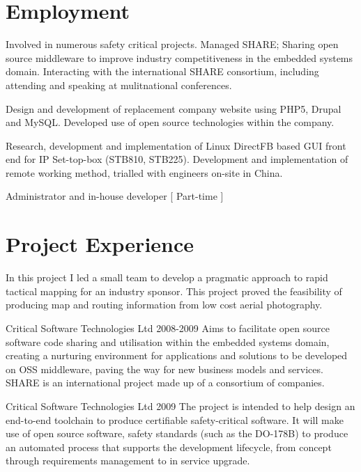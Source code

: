 \documentclass[overlapped,line,letterpaper]{res}
\begin{document}
\begin{resume}
\section{\bf Employment}
{
    Involved in numerous safety critical projects. Managed SHARE; 
    Sharing open source middleware to improve industry competitiveness
    in the embedded systems domain. Interacting with the international SHARE 
    consortium, including attending and speaking at mulitnational conferences.
}

{
    Design and development of replacement company website using PHP5, Drupal and
    MySQL.
    Developed use of open source technologies within the company.
}

{
    Research, development and implementation of Linux DirectFB based GUI front end
    for IP Set-top-box (STB810, STB225). Development and implementation of remote
    working method, trialled with engineers on-site in China.
}

{
    Administrator and in-house developer [ Part-time ]
}


\section{\bf Project Experience}
{
    In this project I led a small team to develop a pragmatic approach to rapid
    tactical mapping for an industry sponsor. 
    This project proved the feasibility of producing map and routing information
    from low cost aerial photography.    
}

  {Critical Software Technologies Ltd}
  {2008-2009}
{
    Aims to facilitate open source software code sharing and utilisation within 
    the embedded systems domain, creating a nurturing environment for 
    applications and solutions to be developed on OSS middleware, paving the way
    for new business models and services. 
    SHARE is an international project made up of a consortium of companies.
}

  {Critical Software Technologies Ltd}
  {2009}
{ 
    The project is intended to help design an end-to-end toolchain to produce 
    certifiable safety-critical software. 
    It will make use of open source software, safety standards (such as the 
    DO-178B) to produce an automated process that supports the development 
    lifecycle, from concept through requirements management to in service 
    upgrade. 
}


\end{resume}
\end{document}
